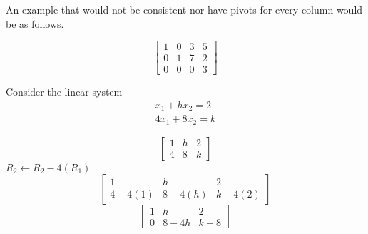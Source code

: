 \documentclass[12pt,letterpaper, onecolumn]{exam}
\begin{document}
\begin{questions}
\begin{solution}
            An example that would not be consistent nor have pivots for every column would be as follows.
            
            $$
            \begin{bmatrix}
                1 & 0 & 3 & 5\\
                0 & 1 & 7 & 2\\
                0 & 0 & 0 & 3
            \end{bmatrix}
            $$
        \end{solution}

    \question Consider the linear system\\
            $$
            \begin{matrix}
                x_1 + hx_2 = 2\\
                4x_1 + 8x_2 = k
            \end{matrix}
            $$
        \begin{solution}
            $$
            \begin{bmatrix}
                1 & h & 2\\
                4 & 8 & k
            \end{bmatrix}
            $$
            $R_2 \leftarrow R_2 - 4(R_1)$
            $$
            \begin{bmatrix}
                1 & h & 2\\
                4 - 4(1) & 8 - 4(h) & k - 4(2)
            \end{bmatrix}
            $$
            $$
            \begin{bmatrix}
                1 & h & 2\\
                0 & 8 - 4h & k - 8
            \end{bmatrix}
            $$
            \begin{parts}

\end{parts}
\end{solution}
\end{questions}
\end{document}
